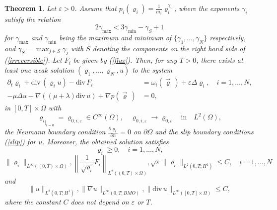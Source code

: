\documentclass[11pt]{article}
\newcommand{\ddiv}{\mathrm{div\,}}
\newtheorem{tw}{Theorem}
\numberwithin{equation}{section}
\numberwithin{tw}{section}
\begin{document}
\begin{tw}\label{appr_th}
Let $\varepsilon>0$.
    Assume that $p_i(\varrho_i)=\frac{1}{m_i}\varrho_i^{\gamma_i}$, where the exponents $\gamma_i$ satisfy the relation
    \begin{equation}\label{gammas} 2\gamma_{\max} < 3\gamma_{\min} - \gamma_S+1 \end{equation}
    for $\gamma_{\max}$ and $\gamma_{\min}$ being the maximum and minimum of $\{\gamma_1,\dots,\gamma_N\}$ respectively, and $\gamma_S=\max_{j\in S}\gamma_j$ with $S$ denoting the components on the right hand side of (\ref{irreversible}). Let $F_i$ be given by (\ref{flux}). Then, for any $T>0$, there exists at least one weak solution $(\varrho_1,\ldots,\varrho_N,u)$ to the system
    \begin{equation}\label{approx}
    \begin{aligned}
    \partial_t\varrho_{i} + \ddiv(\varrho_{i} u) -\ddiv F_{i} &= \omega_{i}(\vec\varrho\,) + \varepsilon\Delta\varrho_i, \quad i=1,\dots,N ,\\
   -\mu\Delta u -\nabla((\mu+\lambda)\ddiv u) + \nabla p(\vec\varrho\,) &= 0,
    \end{aligned}
\end{equation}
in $[0,T]\times\Omega$ with 
\[ {\varrho_i}_{|_{t=0}} = \varrho_{0,i,\varepsilon}\in C^\infty(\Omega), \quad \varrho_{0,i,\varepsilon}\to \varrho_{0,i} \quad \text{in} \quad L^2(\Omega), \]
the Neumann boundary condition $\frac{\partial\varrho_i}{\partial n}=0$ on $\partial\Omega$ 
and the slip boundary conditions (\ref{slip}) for $u$. Moreover, the obtained solution satisfies
\[ \varrho_i \geq 0, \quad i=1,\ldots,N, \]
\[ \|\varrho_i\|_{L^\infty((0,T)\times\Omega)}, \left\|\frac{1}{\sqrt{\varrho_i}}F_i\right\|_{L^2((0,T)\times\Omega)}, \sqrt{\varepsilon}\|\varrho_i\|_{L^2(0,T;H^1)} \leq C, \quad i=1,\ldots,N \]
and 
\[ \|u\|_{L^2(0,T;H^1)}, \|\nabla u\|_{L^\infty(0,T;BMO)}, \|\ddiv u\|_{L^\infty([0,T]\times\Omega)} \leq C, \]
where the constant $C$ does not depend on $\varepsilon$ or $T$.
\end{tw}
\end{document}
